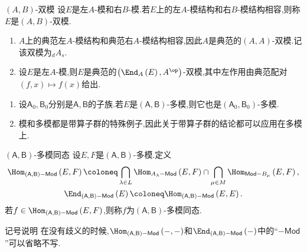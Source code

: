 \begin{definition}{$\left(A,B\right)$-双模}{}
	设$E$是左$A$-模和右$B$-模.若$E$上的左$A$-模结构和右$B$-模结构相容,则称$E$是$\left(A,B\right)$-双模.
\end{definition}

\begin{example}{}{}
	\begin{enumerate}
		\item $A$上的典范左$A$-模结构和典范右$A$-模结构相容,因此$A$是典范的$\left(A,A\right)$-双模.记该双模为${}_{d}A_{s}$.
		\item 设$E$是左$A$-模,则$E$是典范的$\left(\End_{{A}}\left(E\right),A^{\op}\right)$-双模,其中左作用由典范配对$\left(f,x\right)\mapsto f\left(x\right)$给出.
	\end{enumerate}
\end{example}

\begin{remark}{}{}
	\begin{enumerate}
		\item 设$\mathsf{A}_{0},\mathsf{B}_{0}$分别是$\mathsf{A},\mathsf{B}$的子族.若$E$是$\left(\mathsf{A},\mathsf{B}\right)$-多模,则它也是$\left(\mathsf{A}_{0},\mathsf{B}_{0}\right)$-多模.
		\item 模和多模都是带算子群的特殊例子,因此关于带算子群的结论都可以应用在多模上.
	\end{enumerate}
\end{remark}

\begin{definition}{$\left(\mathsf{A},\mathsf{B}\right)$-多模同态}{}
	设$E,F$是$\left(\mathsf{A},\mathsf{B}\right)$-多模.定义
	\begin{gather*}
		\Hom_{\left(\mathsf{A},\mathsf{B}\right)-\mathsf{Mod}}\left(E,F\right)\coloneq\bigcap\limits_{\lambda\in L}\Hom_{A_{\lambda}-\mathsf{Mod}}\left(E,F\right)\cap\bigcap\limits_{\mu\in M}\Hom_{\mathsf{Mod}-B_{\mu}}\left(E,F\right),\\
		\End_{\left(\mathsf{A},\mathsf{B}\right)-\mathsf{Mod}}\left(E\right)\coloneq\Hom_{\left(\mathsf{A},\mathsf{B}\right)-\mathsf{Mod}}\left(E,E\right).
	\end{gather*}
	若$f\in\Hom_{\left(\mathsf{A},\mathsf{B}\right)-\mathsf{Mod}}\left(E,F\right)$,则称$f$为$\left(\mathsf{A},\mathsf{B}\right)$-多模同态.
\end{definition}

\begin{remark}{记号说明}{}
	在没有歧义的时候,$\Hom_{\left(\mathsf{A},\mathsf{B}\right)-\mathsf{Mod}}\left(-,-\right)$和$\End_{\left(\mathsf{A},\mathsf{B}\right)-\mathsf{Mod}}\left(-\right)$中的``$-\mathsf{Mod}$''可以省略不写.
\end{remark}

